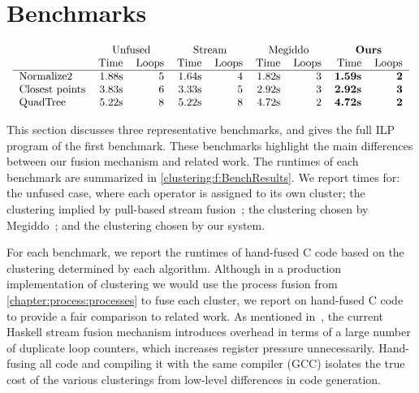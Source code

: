 \section{Benchmarks}
\label{clustering:s:Benchmarks}

\begin{table}
$$\begin{array}{c}

\begin{tabular}{lrrrrrrrr}
                & \multicolumn{2}{c}{Unfused}         & \multicolumn{2}{c}{Stream}
                & \multicolumn{2}{c}{Megiddo} &\multicolumn{2}{c}{\textbf{Ours}} \\
                & Time & Loops   & Time & Loops      & Time & Loops & Time & Loops   \\
\hline
Normalize2      & 1.88s & 5      & 1.64s & 4          & 1.82s & 3  & \textbf{1.59s} & \textbf{2}\\
Closest points  & 3.83s & 6      & 3.33s & 5          & 2.92s & 3  & \textbf{2.92s} & \textbf{3}\\
QuadTree        & 5.22s & 8      & 5.22s & 8          & 4.72s & 2  & \textbf{4.72s} & \textbf{2}\\
\end{tabular}

\end{array}$$
\caption{Benchmark results}
\label{clustering:f:BenchResults}
\end{table}

This section discusses three representative benchmarks, and gives the full ILP program of the first benchmark.
These benchmarks highlight the main differences between our fusion mechanism and related work.
The runtimes of each benchmark are summarized in \cref{clustering:f:BenchResults}.
We report times for: the unfused case, where each operator is assigned to its own cluster; the clustering implied by pull-based stream fusion~\cite{coutts2007stream}; the clustering chosen by Megiddo~\cite{megiddo1998optimal}; and the clustering chosen by our system. 

For each benchmark, we report the runtimes of hand-fused C code based on the clustering determined by each algorithm.
Although in a production implementation of clustering we would use the process fusion from \cref{chapter:process:processes} to fuse each cluster, we report on hand-fused C code to provide a fair comparison to related work.
As mentioned in~\citet{lippmeier2013data}, the current Haskell stream fusion mechanism introduces overhead in terms of a large number of duplicate loop counters, which increases register pressure unnecessarily.
Hand-fusing all code and compiling it with the same compiler (GCC) isolates the true cost of the various clusterings from low-level differences in code generation.

